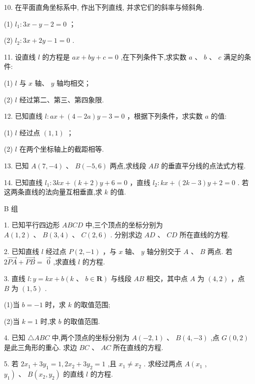 \documentclass[10pt]{article}
\begin{document}
10. 在平面直角坐标系中, 作出下列直线, 并求它们的斜率与倾斜角.

(1) \({l}_{1} : {3x} - y - 2 = 0\) ；

(2) \({l}_{2} : {3x} + {2y} - 1 = 0\) .

11. 设直线 \(l\) 的方程是 \({ax} + {by} + c = 0\) ,在下列条件下,求实数 \(a\text{ 、 }b\text{ 、 }c\) 满足的条件:

(1) \(l\) 与 \(x\) 轴、 \(y\) 轴均相交；

(2) \(l\) 经过第二、第三、第四象限.

12. 已知直线 \(l : {ax} + \left( {4 - {2a}}\right) y - 3 = 0\) ，根据下列条件，求实数 \(a\) 的值:

(1) \(l\) 经过点 \(\left( {1,1}\right)\) ；

(2) \(l\) 在两个坐标轴上的截距相等.

13. 已知 \(A\left( {7, - 4}\right) \text{ 、 }B\left( {-5,6}\right)\) 两点,求线段 \({AB}\) 的垂直平分线的点法式方程.

14. 已知直线 \({l}_{1} : {3kx} + \left( {k + 2}\right) y + 6 = 0\) ，直线 \({l}_{2} : {kx} + \left( {{2k} - 3}\right) y + 2 = 0\) . 若这两条直线的法向量互相垂直,求 \(k\) 的值.

B 组

1. 已知平行四边形 \({ABCD}\) 中,三个顶点的坐标分别为 \(A\left( {1,2}\right) \text{ 、 }B\left( {3,4}\right) \text{ 、 }C\left( {2,6}\right)\) . 分别求边 \({AD}\text{ 、 }{CD}\) 所在直线的方程.

2. 已知直线 \(l\) 经过点 \(P\left( {2, - 1}\right)\) ，与 \(x\) 轴、 \(y\) 轴分别交于 \(A\) 、 \(B\) 两点. 若 \(2\overrightarrow{PA} + \overrightarrow{PB} = \; \overrightarrow{0}\) ,求直线 \(l\) 的方程.

3. 直线 \(l : y = {kx} + b\left( {k\text{ 、 }b \in  \mathbf{R}}\right)\) 与线段 \({AB}\) 相交，其中点 \(A\) 为 \(\left( {4,2}\right)\) ，点 \(B\) 为 \(\left( {1,5}\right)\) .

(1)当 \(b =  - 1\) 时，求 \(k\) 的取值范围;

(2)当 \(k = 1\) 时,求 \(b\) 的取值范围.

4. 已知 \(\bigtriangleup {ABC}\) 中,两个顶点的坐标分别为 \(A\left( {-2,1}\right) \text{ 、 }B\left( {4, - 3}\right)\) ,点 \(G\left( {0,2}\right)\) 是此三角形的重心. 求边 \({BC}\text{ 、 }{AC}\) 所在直线的方程.

5. 若 \(2{x}_{1} + 3{y}_{1} = 1,2{x}_{2} + 3{y}_{2} = 1\) ,且 \({x}_{1} \neq  {x}_{2}\) . 求经过两点 \(A\left( {x}_{1}\right.\) , \(\left. {y}_{1}\right) \text{ 、 }B\left( {{x}_{2},{y}_{2}}\right)\) 的直线 \(l\) 的方程.
\end{document}
